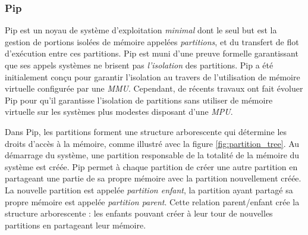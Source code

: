 			\subsubsection{Pip}
	\label{sec:pip}

	Pip est un noyau de système d'exploitation \emph{minimal} dont le seul but est la gestion de portions isolées de mémoire appelées \emph{partitions}, et du transfert de flot d'exécution entre ces partitions. Pip est muni d'une preuve formelle garantissant que ses appels systèmes ne brisent pas \emph{l'isolation} des partitions. Pip a été initialement conçu pour garantir l'isolation au travers de l'utilisation de mémoire virtuelle configurée par une \emph{MMU}. Cependant, de récents travaux \cite{dejon2022mmu} ont fait évoluer Pip pour qu'il garantisse l'isolation de partitions sans utiliser de mémoire virtuelle sur les systèmes plus modestes disposant d'une \emph{MPU}.

	Dans Pip, les partitions forment une structure arborescente qui détermine les droits d'accès à la mémoire, comme illustré avec la figure \ref{fig:partition_tree}. Au démarrage du système, une partition responsable de la totalité de la mémoire du système est créée. Pip permet à chaque partition de créer une autre partition en partageant une partie de sa propre mémoire avec la partition nouvellement créée. La nouvelle partition est appelée \emph{partition enfant}, la partition ayant partagé sa propre mémoire est appelée \emph{partition parent}. Cette relation parent/enfant crée la structure arborescente : les enfants pouvant créer à leur tour de nouvelles partitions en partageant leur mémoire.

	\begin{figure}[!ht]
	\end{figure}

	

